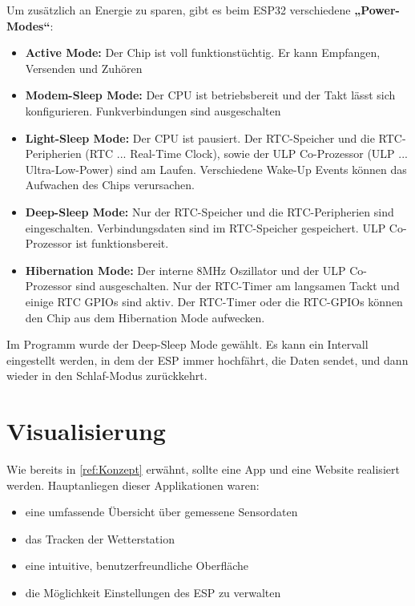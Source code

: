         Um zusätzlich an Energie zu sparen, gibt es beim ESP32 verschiedene \textbf{„Power-Modes“}: 
        
        \begin{itemize}
            \item \textbf{Active Mode: }        Der Chip ist voll funktionstüchtig. Er kann Empfangen, Versenden und Zuhören
            \item \textbf{Modem-Sleep Mode: }	Der CPU ist betriebsbereit und der Takt lässt sich konfigurieren. Funkverbindungen sind ausgeschalten
            \item \textbf{Light-Sleep Mode: }	Der CPU ist pausiert. Der RTC-Speicher und die RTC-Peripherien (RTC ... Real-Time Clock), sowie der ULP Co-Prozessor (ULP ... Ultra-Low-Power) sind am Laufen. Verschiedene Wake-Up Events können das Aufwachen des Chips verursachen. 
            \item\label{ref:DeepSleep} \textbf{Deep-Sleep Mode: }    Nur der RTC-Speicher und die RTC-Peripherien sind eingeschalten. Verbindungsdaten sind im RTC-Speicher gespeichert. ULP Co-Prozessor ist funktionsbereit. 
            \item \textbf{Hibernation Mode: }   Der interne 8MHz Oszillator und der ULP Co-Prozessor sind ausgeschalten. Nur der RTC-Timer am langsamen Tackt und einige RTC GPIOs sind aktiv. Der RTC-Timer oder die RTC-GPIOs können den Chip aus dem Hibernation Mode aufwecken. 
        \end{itemize}
        \begin{flushright}
            \cite{bib:esp32datasheet}
        \end{flushright}
        Im Programm wurde der Deep-Sleep Mode gewählt. Es kann ein Intervall eingestellt werden, in dem der ESP immer hochfährt, die Daten sendet, und dann wieder in den Schlaf-Modus zurückkehrt. 
        
\pagebreak

         
    \section{Visualisierung}
    
         Wie bereits in \ref{ref:Konzept} erwähnt, sollte eine App und eine Website realisiert werden. Hauptanliegen dieser Applikationen waren: 
         
         \begin{itemize}
            \item   eine umfassende Übersicht über gemessene Sensordaten
            \item   das Tracken der Wetterstation
            \item   eine intuitive, benutzerfreundliche Oberfläche
            \item   die Möglichkeit Einstellungen des ESP zu verwalten
        \end{itemize}
        
